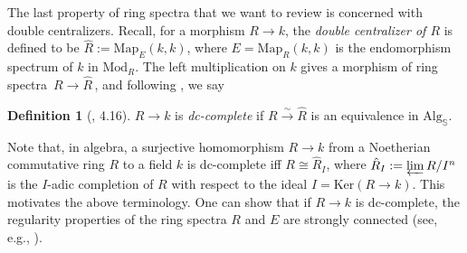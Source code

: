 \documentclass[11pt]{amsart}
\theoremstyle{definition}
\newtheorem{defi}[theorem]{Definition}
\theoremstyle{remark}
\numberwithin{equation}{section}
\newcommand{\la}{\label}
\newcommand{\Ker}{\mathrm{Ker}}
\newcommand{\Map}{\mathrm{Map}}
\def\bS{\mathbb S}
\def\Mod{\mathrm{Mod}}
\def\Alg{\mathrm{Alg}}
\begin{document}
The last property of ring spectra that we want to review is concerned with double centralizers. Recall, for a morphism $ R \to k $, the {\it double centralizer of $R$} is defined to be $ \hat{R} := \Map_E(k,k) $, where
$ E = \Map_R(k,k) $ is the endomorphism spectrum of $k$ in $\Mod_R$. The left multiplication on $k$ gives a morphism of ring spectra $\, R \to \hat{R} \,$, and following \cite{DGI06}, we say 
%
\begin{defi}[\cite{DGI06}, 4.16]
\la{dc}
$ R\to k $ is {\it dc-complete} if $ R \xrightarrow{\sim} \hat{R} $ is an equivalence in $ \Alg_{\bS}$.
\end{defi}
%
Note that, in algebra, a surjective homomorphism $ R \to k $ from a Noetherian commutative ring $R$ to a field $k$ is dc-complete iff $ R \cong \hat{R}_I $, where $ \hat{R}_I := \varprojlim R/I^n $ is the $I$-adic completion of $R$ with respect to the ideal $ I = \Ker(R \to k)$. This motivates the above terminology. One can show that if 
$ R \to k $ is dc-complete, the regularity properties of the ring spectra $R$ and $ E $ are strongly connected
(see, e.g., \cite[Proposition 4.17]{DGI06}).
%
\end{document}
